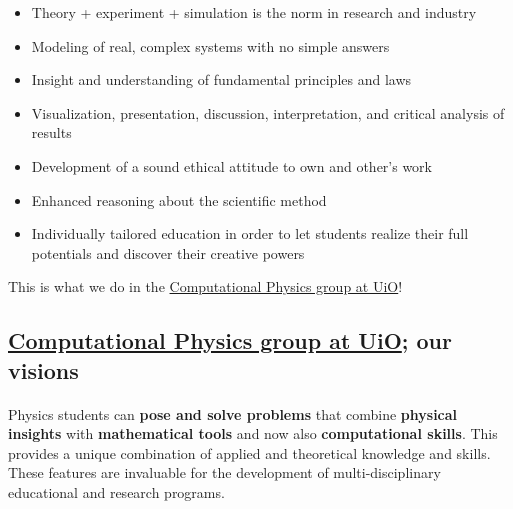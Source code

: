 \documentclass[%
twoside,                 %
final,                   %
10pt]{article}
\begin{document}
\begin{itemize}
\item Theory + experiment + simulation is the norm in research and industry

\item Modeling of real, complex systems with no simple answers

\item Insight and understanding of fundamental principles and laws

\item Visualization, presentation, discussion, interpretation, and critical analysis of results

\item Development of a sound ethical attitude to own and other's work

\item Enhanced reasoning about the scientific method

\item Individually tailored education in order to let students  realize their full potentials and discover their creative powers
\end{itemize}

\noindent
This is what we do in the \href{{http://www.mn.uio.no/fysikk/english/research/groups/computational/index.html}}{Computational Physics group at UiO}!




\subsection{\href{{http://www.mn.uio.no/fysikk/english/research/groups/computational/index.html}}{Computational Physics group at UiO}; our visions}


\paragraph{}
Physics students can \textbf{pose and solve problems} that combine \textbf{physical insights} with \textbf{mathematical tools} and now also \textbf{computational skills}. This provides a unique combination of applied and theoretical knowledge and skills. These features are invaluable for the development of multi-disciplinary educational and research programs.


\end{document}
